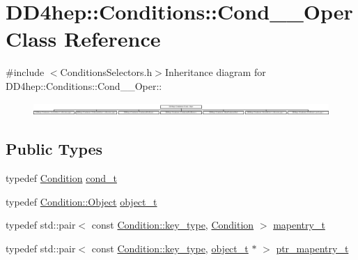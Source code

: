 \hypertarget{class_d_d4hep_1_1_conditions_1_1_cond_____oper}{
\section{DD4hep::Conditions::Cond\_\-\_\-Oper Class Reference}
\label{class_d_d4hep_1_1_conditions_1_1_cond_____oper}
}


{\ttfamily \#include $<$ConditionsSelectors.h$>$}Inheritance diagram for DD4hep::Conditions::Cond\_\-\_\-Oper::\begin{figure}[H]
\begin{center}
\leavevmode
\includegraphics[height=0.474777cm]{class_d_d4hep_1_1_conditions_1_1_cond_____oper}
\end{center}
\end{figure}
\subsection*{Public Types}
\begin{DoxyCompactItemize}
\item 
typedef \hyperlink{class_d_d4hep_1_1_conditions_1_1_condition}{Condition} \hyperlink{class_d_d4hep_1_1_conditions_1_1_cond_____oper_aceca9f6a0e8c84364946eace47275d09}{cond\_\-t}
\item 
typedef \hyperlink{class_d_d4hep_1_1_conditions_1_1_interna_1_1_condition_object}{Condition::Object} \hyperlink{class_d_d4hep_1_1_conditions_1_1_cond_____oper_a4229491e49bfd21058dff10125a73f63}{object\_\-t}
\item 
typedef std::pair$<$ const \hyperlink{class_d_d4hep_1_1_conditions_1_1_condition_a7528efa762e8cc072ef80ea67c3531f9}{Condition::key\_\-type}, \hyperlink{class_d_d4hep_1_1_conditions_1_1_condition}{Condition} $>$ \hyperlink{class_d_d4hep_1_1_conditions_1_1_cond_____oper_a877dac3da66795207aed15be219acbdc}{mapentry\_\-t}
\item 
typedef std::pair$<$ const \hyperlink{class_d_d4hep_1_1_conditions_1_1_condition_a7528efa762e8cc072ef80ea67c3531f9}{Condition::key\_\-type}, \hyperlink{class_d_d4hep_1_1_conditions_1_1_interna_1_1_condition_object}{object\_\-t} $\ast$ $>$ \hyperlink{class_d_d4hep_1_1_conditions_1_1_cond_____oper_a0949e4bd5f90cd3fae2394cf30983973}{ptr\_\-mapentry\_\-t}
\end{DoxyCompactItemize}


